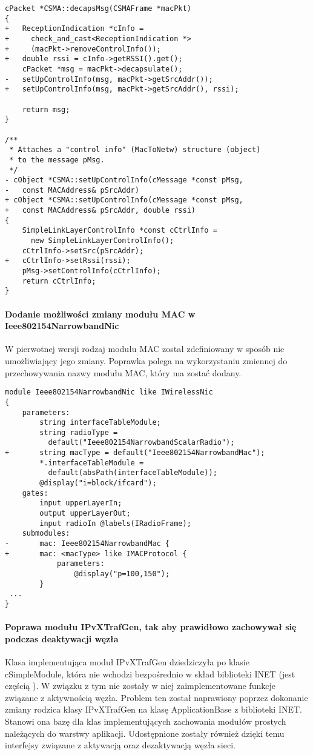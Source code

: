 \begin{verbatim}
cPacket *CSMA::decapsMsg(CSMAFrame *macPkt)
{
+   ReceptionIndication *cInfo =
+     check_and_cast<ReceptionIndication *>
+     (macPkt->removeControlInfo());
+   double rssi = cInfo->getRSSI().get();
    cPacket *msg = macPkt->decapsulate();
-   setUpControlInfo(msg, macPkt->getSrcAddr());
+   setUpControlInfo(msg, macPkt->getSrcAddr(), rssi);

    return msg;
}

/**
 * Attaches a "control info" (MacToNetw) structure (object)
 * to the message pMsg.
 */
- cObject *CSMA::setUpControlInfo(cMessage *const pMsg,
-   const MACAddress& pSrcAddr)
+ cObject *CSMA::setUpControlInfo(cMessage *const pMsg,
+   const MACAddress& pSrcAddr, double rssi)
{
    SimpleLinkLayerControlInfo *const cCtrlInfo =
      new SimpleLinkLayerControlInfo();
    cCtrlInfo->setSrc(pSrcAddr);
+   cCtrlInfo->setRssi(rssi);
    pMsg->setControlInfo(cCtrlInfo);
    return cCtrlInfo;
}
\end{verbatim}

\paragraph{Dodanie możliwości zmiany modułu MAC w Ieee802154NarrowbandNic} W pierwotnej wersji rodzaj modułu MAC został zdefiniowany w sposób nie umożliwiający jego zmiany. Poprawka polega na wykorzystaniu zmiennej do przechowywania nazwy modułu MAC, który ma zostać dodany.
\begin{verbatim}
module Ieee802154NarrowbandNic like IWirelessNic
{
    parameters:
        string interfaceTableModule;
        string radioType =
          default("Ieee802154NarrowbandScalarRadio");
+       string macType = default("Ieee802154NarrowbandMac");
        *.interfaceTableModule =
          default(absPath(interfaceTableModule));
        @display("i=block/ifcard");
    gates:
        input upperLayerIn;
        output upperLayerOut;
        input radioIn @labels(IRadioFrame);
    submodules:
-       mac: Ieee802154NarrowbandMac {
+       mac: <macType> like IMACProtocol {
            parameters:
                @display("p=100,150");
        }
 ...
}
\end{verbatim}

\paragraph{Poprawa modułu IPvXTrafGen, tak aby prawidłowo zachowywał się podczas deaktywacji węzła} Klasa implementująca moduł IPvXTrafGen dziedziczyła po klasie cSimpleModule, która nie wchodzi bezpośrednio w skład biblioteki INET (jest częścią \omnetpp). W związku z tym nie zostały w niej zaimplementowane funkcje związane z aktywnością węzła. Problem ten został naprawiony poprzez dokonanie zmiany rodzica klasy IPvXTrafGen na klasę ApplicationBase z biblioteki INET. Stanowi ona bazę dla klas implementujących zachowania modułów prostych należących do warstwy aplikacji. Udostępnione zostały również dzięki temu interfejsy związane z aktywacją oraz dezaktywacją węzła sieci.

